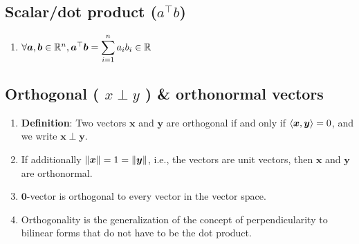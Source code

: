 \subsection{Scalar/dot product ($a^\top b$)}


\begin{enumerate}
    \item $
        \forall \bm{a}, \bm{b} \in \mathbb{R}^n, 
        \bm{a}^\top \bm{b} = \displaystyle\sum^n_{i=1} a_i b_i \in \mathbb{R}    
    $
    \hfill \cite{mfml/book/mml/Deisenroth-Faisal-Ong}
    
\end{enumerate}



\subsection{Orthogonal ( $x \perp y$ ) \& orthonormal vectors}

\begin{enumerate}
    \item \textbf{Definition}: Two vectors $\bm{x}$ and $\bm{y}$ are orthogonal if and only if $\langle\bm{x}, \bm{y}\rangle = 0$, and we write $\bm{x} \perp \bm{y}$. 
    \hfill \cite{mfml/book/mml/Deisenroth-Faisal-Ong}
    
    \item If additionally $\left\| \bm{x} \right\| = 1 = \left\| \bm{y} \right\|$, i.e., the vectors are unit vectors, then $\bm{x}$ and $\bm{y}$ are orthonormal.
    \hfill \cite{mfml/book/mml/Deisenroth-Faisal-Ong}

    \item $\bm{0}$-vector is orthogonal to every vector in the vector space.
    \hfill \cite{mfml/book/mml/Deisenroth-Faisal-Ong}

    \item Orthogonality is the generalization of the concept of perpendicularity to bilinear forms that do not have to be the dot product.
    \hfill \cite{mfml/book/mml/Deisenroth-Faisal-Ong}
\end{enumerate}



























